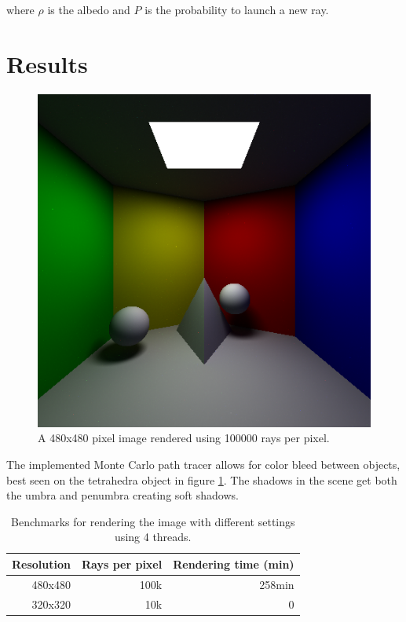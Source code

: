 \documentclass[twocolumn]{article}
\begin{document}
where $\rho$ is the albedo and $P$ is the probability to launch a new ray.

\section{Results}

\begin{figure}[ht]
\centering
\includegraphics[]{pics/p480r100000.png}
\caption{\label{fig:resultat} A 480x480 pixel image rendered using 100000 rays per pixel.}
\end{figure}

The implemented Monte Carlo path tracer allows for color bleed between objects, best seen on the tetrahedra object in figure \ref{fig:resultat}. The shadows in the scene get both the umbra and penumbra creating soft shadows. 



\begin{table}
	\begin{tabular}{ r  r  r}
  		Resolution & Rays per pixel & Rendering time (min) \\
		\hline	
  		480x480 & 100k & 258min \\  		
  		\hline
  		320x320 & 10k & 0 \\
  		
	\end{tabular}
	\caption{\label{tab:benchmarks} Benchmarks for rendering the image with different settings using 4 threads.}
\end{table}
\end{document}
